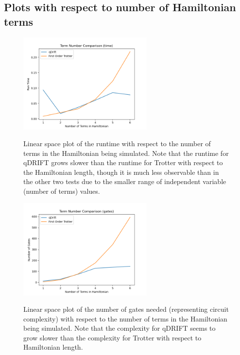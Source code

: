 \documentclass[letterpaper, 11pt]{article}
\begin{document}
\subsection*{Plots with respect to number of Hamiltonian terms}
\begin{figure}[H]
\centering
\includegraphics[width = 0.6\textwidth]{plots/num_terms_time_comp.png}
\label{html}
\caption{Linear space plot of the runtime with respect to the number of terms in the Hamiltonian being simulated. Note that the runtime for qDRIFT grows slower than the runtime for Trotter with respect to the Hamiltonian length, though it is much less observable than in the other two tests due to the smaller range of independent variable (number of terms) values.}
\end{figure}
\begin{figure}[H]
\centering
\includegraphics[width = 0.6\textwidth]{plots/num_terms_gates_comp.png}
\label{html}
\caption{Linear space plot of the number of gates needed (representing circuit complexity) with respect to the number of terms in the Hamiltonian being simulated. Note that the complexity for qDRIFT seems to grow slower than the complexity for Trotter with respect to Hamiltonian length.}
\end{figure}
\end{document}

